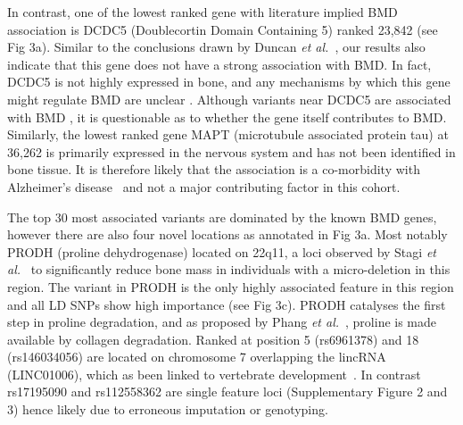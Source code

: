 \documentclass[10pt,letterpaper]{article}
\begin{document}

In contrast, one of the lowest ranked gene with literature implied BMD association is DCDC5 (Doublecortin Domain Containing 5) ranked 23,842
(see Fig 3a).
Similar to the conclusions drawn by Duncan {\it et
  al.}~\cite{Duncan.2011}, our results also indicate that this gene does not have a strong association with BMD.  In
fact, DCDC5 is not highly expressed in bone, and any mechanisms by which this gene might regulate BMD are unclear
\cite{Thakker2012}.  Although variants near DCDC5 are associated with BMD \cite{Rivadeneira2009}, it is questionable as
to whether the gene itself contributes to BMD.
Similarly, the lowest ranked gene MAPT (microtubule associated protein tau) at 36,262 is primarily expressed in the nervous system and has not been identified in bone tissue. 
It is therefore likely that the association is a co-morbidity with Alzheimer's disease~\cite{Dengler-Crish2017} and not a major contributing factor in this cohort. 



The top 30 most associated variants are dominated by the known BMD genes, however there are also four novel locations as annotated in
Fig 3a.
Most notably PRODH (proline dehydrogenase) located on 22q11, a loci observed by Stagi {\it
  et al.}~\cite{Stagi.2010} to significantly reduce bone mass in individuals with a micro-deletion in this region. The
variant in PRODH is the only highly associated feature in this region and all LD SNPs show high importance (see Fig 3c).%
PRODH catalyses the first step in proline degradation, and as proposed by Phang
{\it et al.}~\cite{Phang.2008}, proline is made available by collagen degradation. Ranked at position 5 (rs6961378) and 18 (rs146034056) are located on chromosome 7 overlapping the lincRNA (LINC01006), which as been linked to vertebrate development~\cite{Woolfe2005}.
In contrast rs17195090 and rs112558362 are single feature loci (Supplementary Figure 2 and 3) hence likely due to erroneous imputation or genotyping.
\end{document}
